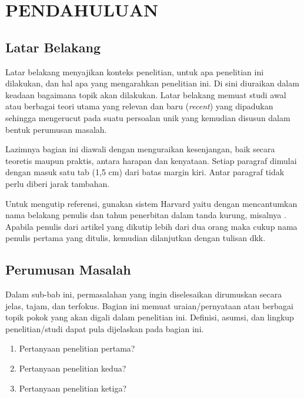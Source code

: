 
\chapter{PENDAHULUAN}

\section{Latar Belakang}

Latar belakang menyajikan konteks penelitian, untuk apa penelitian ini dilakukan, dan hal apa yang mengarahkan penelitian ini. Di sini diuraikan dalam keadaan bagaimana topik akan dilakukan. Latar belakang memuat studi awal atau berbagai teori utama yang relevan dan baru (\textit{recent}) yang dipadukan sehingga mengerucut pada suatu persoalan unik yang kemudian disusun dalam bentuk perumusan masalah.

Lazimnya bagian ini diawali dengan menguraikan kesenjangan, baik secara teoretis maupun praktis, antara harapan dan kenyataan. Setiap paragraf dimulai dengan masuk satu tab (1,5 cm) dari batas margin kiri. Antar paragraf tidak perlu diberi jarak tambahan.

Untuk mengutip referensi, gunakan sistem Harvard yaitu dengan mencantumkan nama belakang penulis dan tahun penerbitan dalam tanda kurung, misalnya \citep{contoh2024}. Apabila penulis dari artikel yang dikutip lebih dari dua orang maka cukup nama penulis pertama yang ditulis, kemudian dilanjutkan dengan tulisan dkk.

\section{Perumusan Masalah}

Dalam sub-bab ini, permasalahan yang ingin diselesaikan dirumuskan secara jelas, tajam, dan terfokus. Bagian ini memuat uraian/pernyataan atau berbagai topik pokok yang akan digali dalam penelitian ini. Definisi, asumsi, dan lingkup penelitian/studi dapat pula dijelaskan pada bagian ini.

\begin{enumerate}
    \item Pertanyaan penelitian pertama?
    \item Pertanyaan penelitian kedua?
    \item Pertanyaan penelitian ketiga?
\end{enumerate}

